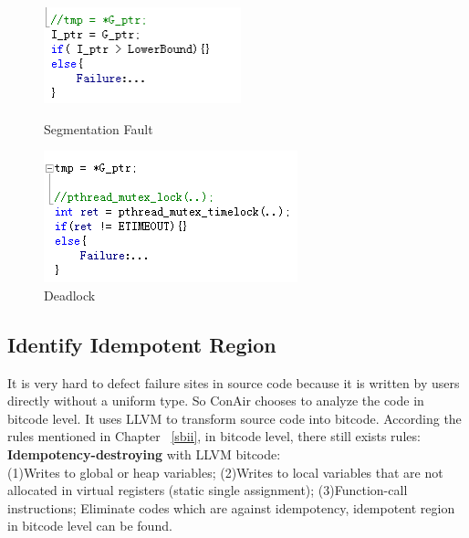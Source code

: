 \begin{figure}
\begin{minipage}[t]{0.48\linewidth}
\centering
\includegraphics[width=\textwidth]{figs/segmentation_fault.png}
\caption{Segmentation Fault}
\label {SF}
\end{minipage}%
\begin{minipage}[t]{0.48\linewidth}
\centering
\includegraphics[width=\textwidth]{figs/deadlock_failure.png}
\caption{Deadlock}
\label{DL}
\end{minipage}
\end{figure}

\subsection{Identify Idempotent Region}
It is very hard to defect failure sites in source code because it is written by users directly without a uniform type. So ConAir chooses to analyze the code in bitcode level. It uses LLVM to transform source code into bitcode. According the rules mentioned in Chapter ~\ref{sbii}, in bitcode level, there still exists rules:\\
\textbf{Idempotency-destroying} with LLVM bitcode:\\
(1)Writes to global or heap variables;
(2)Writes to local variables that are not allocated in virtual registers (static single assignment);
(3)Function-call instructions;
Eliminate codes which are against idempotency, idempotent region in bitcode level can be found.
